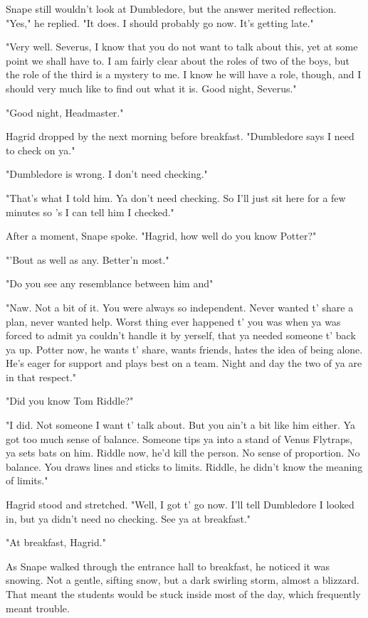 Snape still wouldn't look at Dumbledore, but the answer merited reflection. "Yes," he replied. "It does. I should probably go now. It's getting late."

"Very well. Severus, I know that you do not want to talk about this, yet at some point we shall have to. I am fairly clear about the roles of two of the boys, but the role of the third is a mystery to me. I know he will have a role, though, and I should very much like to find out what it is. Good night, Severus."

"Good night, Headmaster."

Hagrid dropped by the next morning before breakfast. "Dumbledore says I need to check on ya."

"Dumbledore is wrong. I don't need checking."

"That's what I told him. Ya don't need checking. So I'll just sit here for a few minutes so 's I can tell him I checked."

After a moment, Snape spoke. "Hagrid, how well do you know Potter?"

"'Bout as well as any. Better'n most."

"Do you see any resemblance between him{\el} and{\el}"

"Naw. Not a bit of it. You were always so independent. Never wanted t' share a plan, never wanted help. Worst thing ever happened t' you was when ya was forced to admit ya couldn't handle it by yerself, that ya needed someone t' back ya up. Potter now, he wants t' share, wants friends, hates the idea of being alone. He's eager for support and plays best on a team. Night and day the two of ya are in that respect."

"Did you know Tom Riddle?"

"I did. Not someone I want t' talk about. But you ain't a bit like him either. Ya got too much sense of balance. Someone tips ya into a stand of Venus Flytraps, ya sets bats on him. Riddle now, he'd kill the person. No sense of proportion. No balance. You draws lines and sticks to limits. Riddle, he didn't know the meaning of limits."

Hagrid stood and stretched. "Well, I got t' go now. I'll tell Dumbledore I looked in, but ya didn't need no checking. See ya at breakfast."

"At breakfast, Hagrid."

As Snape walked through the entrance hall to breakfast, he noticed it was snowing. Not a gentle, sifting snow, but a dark swirling storm, almost a blizzard. That meant the students would be stuck inside most of the day, which frequently meant trouble.

